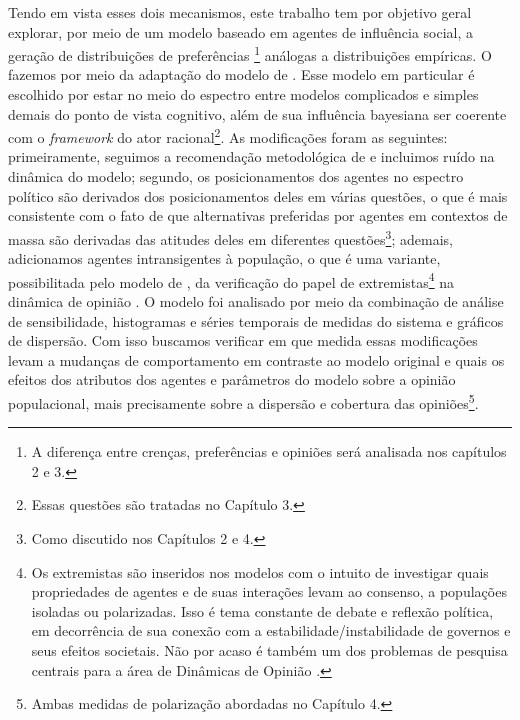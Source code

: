 Tendo em vista esses dois mecanismos, este trabalho tem por objetivo geral
  explorar, por meio de um modelo baseado em agentes de influência social, a
  geração de distribuições de preferências \footnote{A diferença entre crenças,
  preferências e opiniões será analisada nos capítulos 2 e 3.} análogas a
  distribuições empíricas. O fazemos por meio da adaptação do modelo de
  . Esse modelo em particular é escolhido por
  estar no meio do espectro entre modelos complicados e simples demais do ponto
  de vista cognitivo, além de sua influência bayesiana ser coerente com o
  \textit{framework} do ator racional\footnote{Essas questões são tratadas no
  Capítulo 3.}. As modificações foram as seguintes: primeiramente, seguimos a
  recomendação metodológica de  e incluimos ruído na
  dinâmica do modelo; segundo, os posicionamentos dos agentes no espectro
  político são derivados dos posicionamentos deles em várias questões, o que é
  mais consistente com o fato de que alternativas preferidas por agentes em
  contextos de massa são derivadas das atitudes deles em diferentes
  questões\footnote{Como discutido nos Capítulos 2 e 4.}; ademais, adicionamos
  agentes intransigentes à população, o que é uma variante, possibilitada pelo
  modelo de , da verificação do papel de
  extremistas\footnote{ Os extremistas são inseridos nos modelos com o intuito
  de investigar quais propriedades de agentes e de suas interações levam ao
  consenso, a populações isoladas ou polarizadas. Isso é tema constante de
  debate e reflexão política, em decorrência de sua conexão com a
  estabilidade/instabilidade de governos e seus efeitos societais. Não por acaso
  é também um dos problemas de pesquisa centrais para a área de Dinâmicas de
  Opinião \cite{fiorina2005culture, pulick2016, bramson2016disambiguation}.} na
  dinâmica de opinião \cite{deffuant2002can, flache2017}. O modelo foi analisado
  por meio da combinação de análise de sensibilidade, histogramas e séries
  temporais de medidas do sistema e gráficos de dispersão. Com isso buscamos
  verificar em que medida essas modificações levam a mudanças de comportamento
  em contraste ao modelo original e quais os efeitos dos atributos dos agentes e
  parâmetros do modelo sobre a opinião populacional, mais precisamente sobre a
  dispersão e cobertura das opiniões\footnote{Ambas medidas de polarização
  abordadas no Capítulo 4.}.

